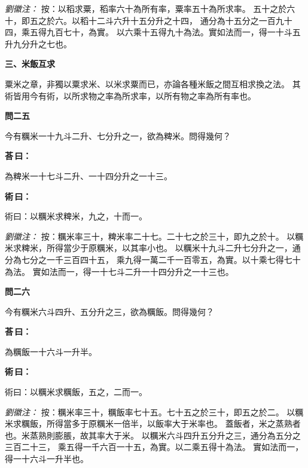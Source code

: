 \documentclass[11pt,a4paper]{article}
\newenvironment{problem}[1][]{%
  \par\vspace{0.6em}\noindent\textcolor{problemcolor}{\textbf{問\ignorespaces#1\unskip}\hspace{0.5em}}%
  \ignorespaces
}{\par\vspace{0.4em}}
\newenvironment{answer}{%
  \par\noindent\textcolor{answercolor}{\textbf{荅\,曰：}}%
  \ignorespaces
}{\par\vspace{0.3em}}
\newenvironment{method}{%
  \par\noindent\textcolor{methodcolor}{\textbf{術\,曰：}}%
  \ignorespaces
}{\par\vspace{0.4em}}
\newenvironment{liuhuicomm}{%
  \par\vspace{0.3em}\noindent\textcolor{commentarycolor}{\small\textit{劉徽注：}}}%
  {\par\vspace{0.5em}}
\begin{document}
\begin{liuhuicomm}
按：以稻求粟，稻率六十為所有率，粟率五十為所求率。
五十之於六十，即五之於六。以稻十二斗六升十五分升之十四，
通分為十五分之一百九十四，乘五得九百七十，為實。
以六乘十五得九十為法。實如法而一，得一十斗五升九分升之七也。
\end{liuhuicomm}

\vspace{0.8em}
\noindent\textbf{\large 三、米飯互求}
\vspace{0.5em}

\noindent 粟米之章，非獨以粟求米、以米求粟而已，亦論各種米飯之間互相求換之法。
其術皆用今有術，以所求物之率為所求率，以所有物之率為所有率也。

\begin{problem}[二五]
今有糲米一十九斗二升、七分升之一，欲為粺米。問得幾何？
\end{problem}

\begin{answer}
為粺米一十七斗二升、一十四分升之一十三。
\end{answer}

\begin{method}
術曰：以糲米求粺米，九之，十而一。
\end{method}

\begin{liuhuicomm}
按：糲米率三十，粺米率二十七。二十七之於三十，即九之於十。
以糲米求粺米，所得當少于原糲米，以其率小也。
以糲米十九斗二升七分升之一，通分為七分之一千三百四十五，
乘九得一萬二千一百零五，為實。以十乘七得七十為法。
實如法而一，得一十七斗二升一十四分升之一十三也。
\end{liuhuicomm}

\begin{problem}[二六]
今有糲米六斗四升、五分升之三，欲為糲飯。問得幾何？
\end{problem}

\begin{answer}
為糲飯一十六斗一升半。
\end{answer}

\begin{method}
術曰：以糲米求糲飯，五之，二而一。
\end{method}

\begin{liuhuicomm}
按：糲米率三十，糲飯率七十五。七十五之於三十，即五之於二。
以糲米求糲飯，所得當多于原糲米一倍半，以飯率大于米率也。
蓋飯者，米之蒸熟者也。米蒸熟則膨脹，故其率大于米。
以糲米六斗四升五分升之三，通分為五分之三百二十三，
乘五得一千六百一十五，為實。以二乘五得十為法。
實如法而一，得一十六斗一升半也。
\end{liuhuicomm}
\end{document}
